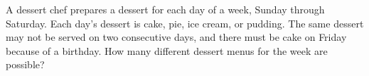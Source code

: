A dessert chef prepares a dessert for each day of a week, Sunday through Saturday. Each day's dessert is cake, pie, ice cream, or pudding. The same dessert may not be served on two consecutive days, and there must be cake on Friday because of a birthday. How many different dessert menus for the week are possible?
